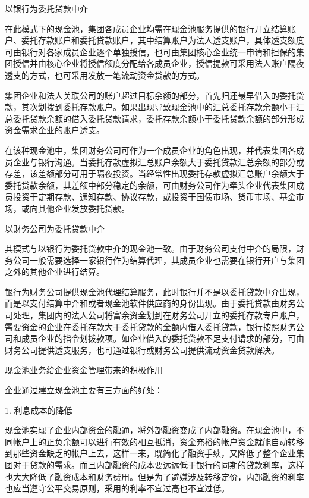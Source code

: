     以银行为委托贷款中介

    在此模式下的现金池，集团各成员企业均需在现金池服务提供的银行开立结算账户、委托存款账户和委托贷款账户，其中结算账户为法人透支账户，具体透支额度可由银行对各家成员企业逐个单独授信，也可由集团核心企业统一申请和担保的集团授信并由核心企业将授信额度分配给各成员企业，授信提款可采用法人账户隔夜透支的方式，也可采用发放一笔流动资金贷款的方式。

    集团企业和法人关联公司的账户超过目标余额的部分，首先归还最早借入的委托贷款，其次划拨到委托存款账户。如果出现导致现金池中的汇总委托存款余额小于汇总委托贷款余额的借入委托贷款请求，委托存款余额小于委托贷款余额的部分形成资金需求企业的账户透支。

    在该种现金池中，集团财务公司可作为一个成员企业的角色出现，并代表集团各成员企业与银行沟通。当委托存款虚拟汇总账户余额大于委托贷款汇总余额的部分或存差，该差额部分可用于隔夜投资。当经常性出现委托存款虚拟汇总账户余额大于委托贷款余额，其差额中部分稳定的余额，可由财务公司作为牵头企业代表集团成员投资于定期存款、通知存款、协议存款，或投资于国债市场、货币市场、基金市场，或向其他企业发放委托贷款。

    以财务公司为委托贷款中介

    其模式与以银行为委托贷款中介的现金池一致。由于财务公司支付中介的局限，财务公司一般需要选择一家银行作为结算代理，其成员企业也需要在银行开户与集团之外的其他企业进行结算。

    银行为财务公司提供现金池代理结算服务，此时银行并不是以委托贷款中介出现，而是以支付结算中介和或者现金池软件供应商的身份出现。由于委托贷款由财务公司处理，集团内的法人公司将富余资金划到在财务公司开立的委托存款专户账户，需要资金的企业在委托存款大于委托贷款的金额内借入委托贷款，银行按照财务公司和成员企业的指令划拨款项。如企业借入的委托贷款不足支付请求的部分，可由财务公司提供透支服务，也可通过银行或财务公司提供流动资金贷款解决。

    现金池业务给企业资金管理带来的积极作用

    企业通过建立现金池主要有三方面的好处：

    1. 利息成本的降低

    现金池实现了企业内部资金的融通，将外部融资变成了内部融资。在现金池中，不同帐户上的正负余额可以进行有效的相互抵消，资金充裕的帐户资金就能自动转移到那些资金缺乏的帐户上去，这样一来，既简化了融资手续，又降低了整个企业集团对于贷款的需求。而且内部融资的成本要远远低于银行的同期的贷款利率，这样也大大降低了融资成本和财务费用。但是为了避嫌涉及转移定价，内部融资的利率也应当遵守公平交易原则，采用的利率不宜过高也不宜过低。

